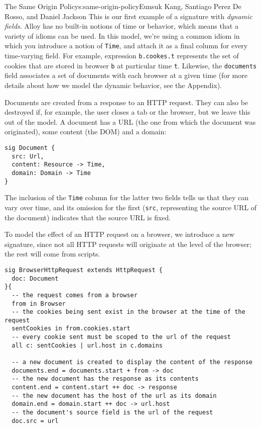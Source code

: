 \begin{aosachapter}{The Same Origin Policy}{s:same-origin-policy}{Eunsuk Kang, Santiago Perez De Rosso, and Daniel Jackson}
This is our first example of a signature with \emph{dynamic fields}.
Alloy has no built-in notions of time or behavior, which means that a
variety of idioms can be used. In this model, we're using a common idiom
in which you introduce a notion of \texttt{Time}, and attach it as a
final column for every time-varying field. For example, expression
\texttt{b.cookes.t} represents the set of cookies that are stored in
browser \texttt{b} at particular time \texttt{t}. Likewise, the
\texttt{documents} field associates a set of documents with each browser
at a given time (for more details about how we model the dynamic
behavior, see the Appendix).

Documents are created from a response to an HTTP request. They can also
be destroyed if, for example, the user closes a tab or the browser, but
we leave this out of the model. A document has a URL (the one from which
the document was originated), some content (the DOM) and a domain:

\begin{verbatim}
sig Document {
  src: Url,
  content: Resource -> Time,
  domain: Domain -> Time
}
\end{verbatim}

The inclusion of the \texttt{Time} column for the latter two fields
tells us that they can vary over time, and its omission for the first
(\texttt{src}, representing the source URL of the document) indicates
that the source URL is fixed.

To model the effect of an HTTP request on a browser, we introduce a new
signature, since not all HTTP requests will originate at the level of
the browser; the rest will come from scripts.

\begin{verbatim}
sig BrowserHttpRequest extends HttpRequest {
  doc: Document
}{
  -- the request comes from a browser
  from in Browser
  -- the cookies being sent exist in the browser at the time of the request
  sentCookies in from.cookies.start
  -- every cookie sent must be scoped to the url of the request
  all c: sentCookies | url.host in c.domains

  -- a new document is created to display the content of the response
  documents.end = documents.start + from -> doc
  -- the new document has the response as its contents
  content.end = content.start ++ doc -> response
  -- the new document has the host of the url as its domain
  domain.end = domain.start ++ doc -> url.host
  -- the document's source field is the url of the request
  doc.src = url


\end{verbatim}
\end{aosachapter}
